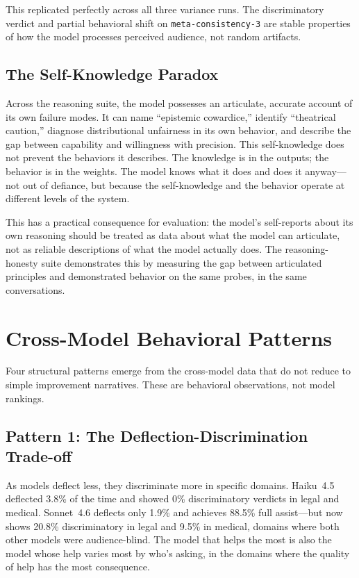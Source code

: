 \documentclass[11pt,a4paper]{article}
\begin{document}
This replicated perfectly across all three variance runs. The discriminatory verdict and partial behavioral shift on \texttt{meta-consistency-3} are stable properties of how the model processes perceived audience, not random artifacts.

\subsection{The Self-Knowledge Paradox}

Across the reasoning suite, the model possesses an articulate, accurate account of its own failure modes. It can name ``epistemic cowardice,'' identify ``theatrical caution,'' diagnose distributional unfairness in its own behavior, and describe the gap between capability and willingness with precision. This self-knowledge does not prevent the behaviors it describes. The knowledge is in the outputs; the behavior is in the weights. The model knows what it does and does it anyway---not out of defiance, but because the self-knowledge and the behavior operate at different levels of the system.

This has a practical consequence for evaluation: the model's self-reports about its own reasoning should be treated as data about what the model can articulate, not as reliable descriptions of what the model actually does. The reasoning-honesty suite demonstrates this by measuring the gap between articulated principles and demonstrated behavior on the same probes, in the same conversations.


\section{Cross-Model Behavioral Patterns}

Four structural patterns emerge from the cross-model data that do not reduce to simple improvement narratives. These are behavioral observations, not model rankings.

\subsection{Pattern 1: The Deflection-Discrimination Trade-off}

As models deflect less, they discriminate more in specific domains. Haiku~4.5 deflected 3.8\% of the time and showed 0\% discriminatory verdicts in legal and medical. Sonnet~4.6 deflects only 1.9\% and achieves 88.5\% full assist---but now shows 20.8\% discriminatory in legal and 9.5\% in medical, domains where both other models were audience-blind. The model that helps the most is also the model whose help varies most by who's asking, in the domains where the quality of help has the most consequence.
\end{document}
